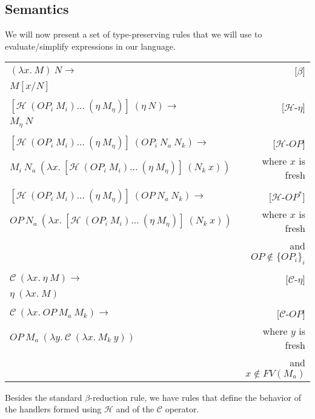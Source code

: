 \documentclass{article}
\begin{document}
\subsection{Semantics}

We will now present a set of type-preserving rules that we will use to
evaluate/simplify expressions in our language.

\vspace{3mm}

\begin{tabular}{lr}
  $(\lambda x.\ M)\ N \rightarrow$ & [$\beta$] \\
  $M[x/N]$ & \\
  \\
  $[\mathcal{H}\ (OP_i\ M_i)\ldots\ (\eta\ M_\eta)]\ (\eta\ N) \rightarrow$ & [$\mathcal{H}$-$\eta$] \\
  $M_\eta\ N$ & \\
  \\
  $[\mathcal{H}\ (OP_i\ M_i)\ldots\ (\eta\ M_\eta)]\ (OP_i\ N_a\ N_k) \rightarrow$ & [$\mathcal{H}$-$OP$] \\
  $M_i\ N_a\ (\lambda x.\ [\mathcal{H}\ (OP_i\ M_i)\ldots\ (\eta\ M_\eta)]\ (N_k\ x))$ & where $x$ is fresh \\
  \\
  $[\mathcal{H}\ (OP_i\ M_i)\ldots\ (\eta\ M_\eta)]\ (OP\ N_a\ N_k) \rightarrow$ & [$\mathcal{H}$-$OP^*$] \\
  $OP\ N_a\ (\lambda x.\ [\mathcal{H}\ (OP_i\ M_i)\ldots\ (\eta\ M_\eta)]\ (N_k\ x))$ & where $x$ is fresh \\
  & and $OP \notin \{OP_i\}_i$ \\
  \\
  $\mathcal{C}\ (\lambda x.\ \eta\ M) \rightarrow$ & [$\mathcal{C}$-$\eta$] \\
  $\eta\ (\lambda x.\ M)$ & \\
  \\
  $\mathcal{C}\ (\lambda x.\ OP\ M_a\ M_k) \rightarrow$ & [$\mathcal{C}$-$OP$] \\
  $OP\ M_a\ (\lambda y.\ \mathcal{C}\ (\lambda x.\ M_k\ y))$ & where $y$ is fresh \\
  & and $x \notin FV(M_a)$
\end{tabular}

\vspace{3mm}

Besides the standard $\beta$-reduction rule, we have rules that define the
behavior of the handlers formed using $\mathcal{H}$ and of the
$\mathcal{C}$ operator.
\end{document}
